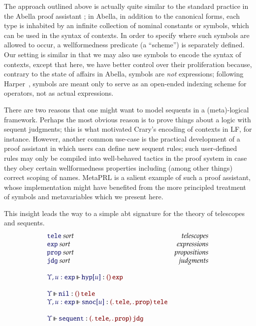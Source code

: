 The approach outlined above is actually quite similar to the standard practice
in the Abella proof assistant \cite{gacek:2008}; in Abella, in addition to the
canonical forms, each type is inhabited by an infinite collection of nominal
constants or symbols, which can be used in the syntax of contexts. In order to
specify where such symbols are allowed to occur, a wellformedness predicate (a
``scheme'') is separately defined. Our setting is similar in that we may also
use symbols to encode the syntax of contexts, except that here, we have better
control over their proliferation because, contrary to the state of affairs in
Abella, symbols are \emph{not} expressions; following
Harper~\cite{harper:2016}, symbols are meant only to serve as an open-ended
indexing scheme for operators, not as actual expressions.

There are two reasons that one might want to model sequents in a (meta)-logical
framework. Perhaps the most obvious reason is to prove things about a logic
with sequent judgments; this is what motivated Crary's encoding of contexts in
LF, for instance. However, another common use-case is the practical development
of a proof assistant in which users can define new sequent rules; such
user-defined rules may only be compiled into well-behaved tactics in the proof
system in case they obey certain wellformedness properties including (among
other things) correct scoping of names. MetaPRL is a salient example of such a
proof assistant, whose implementation might have benefited from the more
principled treatment of symbols and metavariables which we present here.

This insight leads the way to a simple abt signature for the theory of
telescopes and sequents.
%
\newcommand\SortTele{\mathtt{tele}}
\newcommand\SortJdg{\mathtt{jdg}}
\newcommand\SortProp{\mathtt{prop}}
\newcommand\SortExpr{\mathtt{exp}}
\newcommand\OpNil{\mathtt{nil}}
\newcommand\OpSnoc[1]{\mathtt{snoc}[#1]}
\newcommand\OpHyp[1]{\mathtt{hyp}[#1]}
\newcommand\OpSequent{\mathtt{sequent}}
\[
  \begin{array}{lr}
    \IsSort{\SortTele}&\textit{telescopes}\\
    \IsSort{\SortExpr}&\textit{expressions}\\
    \IsSort{\SortProp}&\textit{propositions}\\
    \IsSort{\SortJdg}&\textit{judgments}\\\\
    \IsOperator{\Upsilon, u:\SortExpr}{\OpHyp{u}}{
      \MkArity{}{\SortExpr}
    }\\\\
    \IsOperator{\Upsilon}{\OpNil}{
      \MkArity{}{\SortTele}
    }\\
    \IsOperator{\Upsilon, u:\SortExpr}{\OpSnoc{u}}{
      \MkArity{
        \MkValence{}{}{\SortTele},
        \MkValence{}{}{\SortProp}
      }{\SortTele}
    }\\\\
    \IsOperator{\Upsilon}{\OpSequent}{
      \MkArity{
        \MkValence{}{}{\SortTele},
        \MkValence{}{}{\SortProp}
      }{\SortJdg}
    }
  \end{array}
\]

